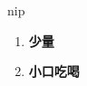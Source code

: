 
\begin{frame}
{\huge nip}
\begin{center}
\begin{enumerate}\Large
  \item \textbf{少量}
  \item \textbf{小口吃喝}
\end{enumerate}
\end{center}
\end{frame}
